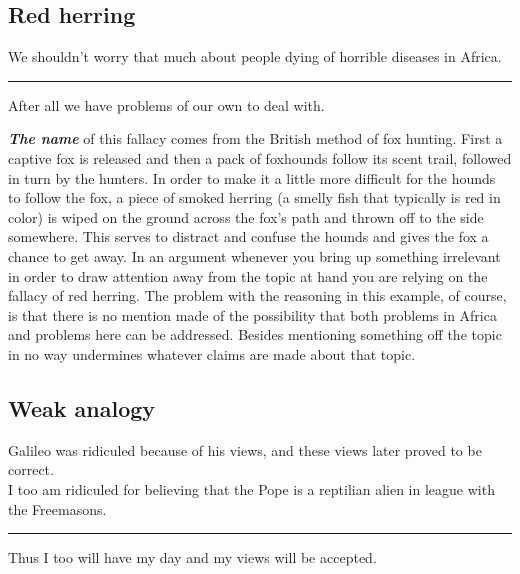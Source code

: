 \documentclass[]{book}
\makeatletter
\newenvironment{kframe}{%
\medskip{}
\setlength{\fboxsep}{.8em}
 \def\at@end@of@kframe{}%
 \ifinner\ifhmode%
  \def\at@end@of@kframe{\end{minipage}}%
  \begin{minipage}{\columnwidth}%
 \fi\fi%
 \def\FrameCommand##1{\hskip\@totalleftmargin \hskip-\fboxsep
 \colorbox{shadecolor}{##1}\hskip-\fboxsep
     \hskip-\linewidth \hskip-\@totalleftmargin \hskip\columnwidth}%
 \MakeFramed {\advance\hsize-\width
   \@totalleftmargin\z@ \linewidth\hsize
   \@setminipage}}%
 {\par\unskip\endMakeFramed%
 \at@end@of@kframe}
\newenvironment{rmdblock}[1]
  {
  \begin{itemize}
  \renewcommand{\labelitemi}{
    \raisebox{-.7\height}[0pt][0pt]{
      {\setkeys{Gin}{width=3em,keepaspectratio}\texttt{[image: img/\#1]}}
    }
  }
  \setlength{\fboxsep}{1em}
  \begin{kframe}
  \item
  }
  {
  \end{kframe}
  \end{itemize}
  }
\newenvironment{rmdwarning}
  {\begin{rmdblock}{warning}}
  {\end{rmdblock}}
\makeatother
\begin{document}
\hypertarget{red-herring}{%
\subsection*{Red herring}\label{red-herring}}


\begin{rmdwarning}
We shouldn't worry that much about people dying of horrible diseases in
Africa.

\begin{center}\rule{0.5\linewidth}{\linethickness}\end{center}

After all we have problems of our own to deal with.
\end{rmdwarning}

\textbf{\emph{The name}} of this fallacy comes from the British method of fox hunting. First a captive fox is released and then a pack of foxhounds follow its scent trail, followed in turn by the hunters. In order to make it a little more difficult for the hounds to follow the fox, a piece of smoked herring (a smelly fish that typically is red in color) is wiped on the ground across the fox's path and thrown off to the side somewhere. This serves to distract and confuse the hounds and gives the fox a chance to get away. In an argument whenever you bring up something irrelevant in order to draw attention away from the topic at hand you are relying on the fallacy of red herring. The problem with the reasoning in this example, of course, is that there is no mention made of the possibility that both problems in Africa and problems here can be addressed. Besides mentioning something off the topic in no way undermines whatever claims are made about that topic.

\hypertarget{weak-analogy}{%
\subsection*{Weak analogy}\label{weak-analogy}}


\begin{rmdwarning}
Galileo was ridiculed because of his views, and these views later proved
to be correct.\\
I too am ridiculed for believing that the Pope is a reptilian alien in
league with the Freemasons.

\begin{center}\rule{0.5\linewidth}{\linethickness}\end{center}

Thus I too will have my day and my views will be accepted.
\end{rmdwarning}
\end{document}
